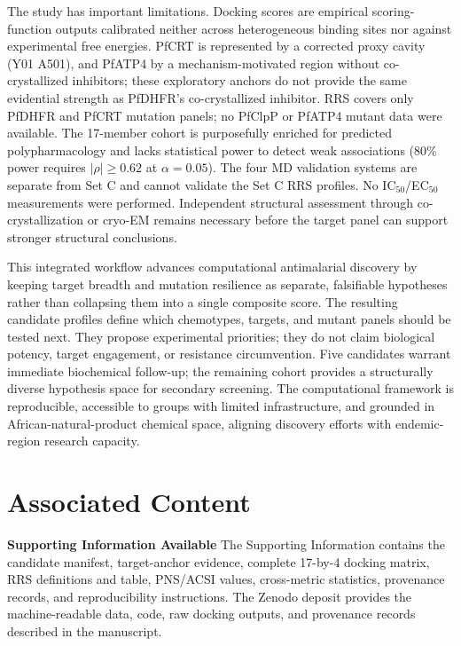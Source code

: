\documentclass[11pt,a4paper]{article}
\begin{document}
The study has important limitations. Docking scores are empirical scoring-function outputs calibrated neither across heterogeneous binding sites nor against experimental free energies. PfCRT is represented by a corrected proxy cavity (Y01 A501), and PfATP4 by a mechanism-motivated region without co-crystallized inhibitors; these exploratory anchors do not provide the same evidential strength as PfDHFR's co-crystallized inhibitor. RRS covers only PfDHFR and PfCRT mutation panels; no PfClpP or PfATP4 mutant data were available. The 17-member cohort is purposefully enriched for predicted polypharmacology and lacks statistical power to detect weak associations (80\% power requires $|\rho| \geq 0.62$ at $\alpha = 0.05$). The four MD validation systems are separate from Set C and cannot validate the Set C RRS profiles. No IC$_{50}$/EC$_{50}$ measurements were performed. Independent structural assessment through co-crystallization or cryo-EM remains necessary before the target panel can support stronger structural conclusions.

This integrated workflow advances computational antimalarial discovery by keeping target breadth and mutation resilience as separate, falsifiable hypotheses rather than collapsing them into a single composite score. The resulting candidate profiles define which chemotypes, targets, and mutant panels should be tested next. They propose experimental priorities; they do not claim biological potency, target engagement, or resistance circumvention. Five candidates warrant immediate biochemical follow-up; the remaining cohort provides a structurally diverse hypothesis space for secondary screening. The computational framework is reproducible, accessible to groups with limited infrastructure, and grounded in African-natural-product chemical space, aligning discovery efforts with endemic-region research capacity.


	
	
	
	\section*{Associated Content}
	\textbf{Supporting Information Available}
	The Supporting Information contains the candidate manifest, target-anchor evidence, complete 17-by-4 docking matrix, RRS definitions and table, PNS/ACSI values, cross-metric statistics, provenance records, and reproducibility instructions. The Zenodo deposit provides the machine-readable data, code, raw docking outputs, and provenance records described in the manuscript.
	
\end{document}

